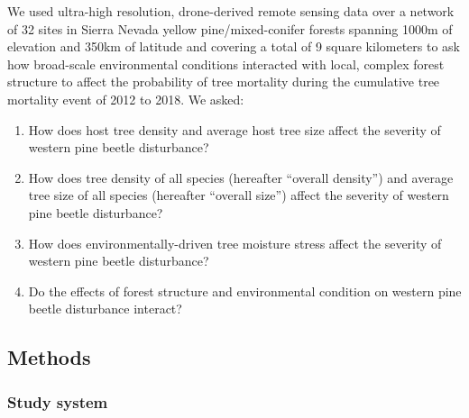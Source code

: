 \documentclass[]{article}
\begin{document}
We used ultra-high resolution, drone-derived remote sensing data over a
network of 32 sites in Sierra Nevada yellow pine/mixed-conifer forests
spanning 1000m of elevation and 350km of latitude and covering a total
of 9 square kilometers to ask how broad-scale environmental conditions
interacted with local, complex forest structure to affect the
probability of tree mortality during the cumulative tree mortality event
of 2012 to 2018. We asked:

\begin{enumerate}
\def\labelenumi{\arabic{enumi}.}
\item
  How does host tree density and average host tree size affect the
  severity of western pine beetle disturbance?
\item
  How does tree density of all species (hereafter ``overall density'')
  and average tree size of all species (hereafter ``overall size'')
  affect the severity of western pine beetle disturbance?
\item
  How does environmentally-driven tree moisture stress affect the
  severity of western pine beetle disturbance?
\item
  Do the effects of forest structure and environmental condition on
  western pine beetle disturbance interact?
\end{enumerate}

\subsection{Methods}\label{methods}

\subsubsection{Study system}\label{study-system}
\end{document}
